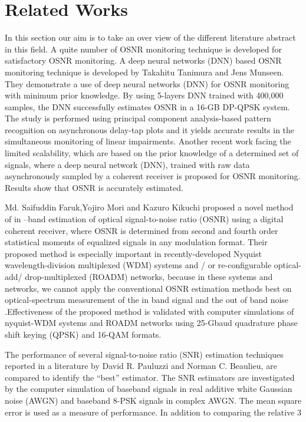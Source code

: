 \documentclass[12pt]{report}
\begin{document}
	\section{Related Works }
	In this section our aim is to take an over view of the different literature abstract in this field. 
	A quite number of OSNR monitoring technique is developed for satisfactory OSNR monitoring. A deep neural networks (DNN) based OSNR monitoring technique is developed by Takahitu Tanimura and Jens Munseen. 
	They demonstrate a use of deep neural networks (DNN) for OSNR monitoring with minimum prior knowledge. By using 5-layers DNN trained with 400,000 samples, the DNN successfully estimates OSNR in a 16-GB DP-QPSK system. 
	The study is performed using principal component analysis-based pattern recognition on asynchronous delay-tap plots and it yields accurate results in the simultaneous monitoring of linear impairments. Another recent work facing the limited scalability, which are based on the prior knowledge of a determined set of signals, where a deep neural network (DNN), trained with raw data asynchronously sampled by a coherent receiver is proposed for OSNR monitoring. Results show that OSNR is accurately estimated.
	
	Md. Saifuddin Faruk,Yojiro Mori and Kazuro Kikuchi proposed a novel method of in –band estimation of optical signal-to-noise ratio (OSNR) using a digital coherent receiver, where  OSNR is determined from second and fourth order statistical moments of equalized signals in any modulation format. Their proposed method is especially important in recently-developed Nyquist wavelength-division multiplexed (WDM) systems and / or re-configurable optical-add/ drop-multiplexed (ROADM) networks, because in these systems and networks, we cannot apply the conventional OSNR estimation methods best on optical-spectrum measurement of the in band signal and the out of band noise .Effectiveness of the proposed method is validated with computer simulations of nyquist-WDM systems and ROADM networks using 25-Gbaud quadrature phase shift keying (QPSK) and 16-QAM formats.
	
	
	The performance of several signal-to-noise ratio (SNR) estimation techniques reported in a literature by David R. Pauluzzi and Norman C. Beaulieu, are compared to identify the “best” estimator. The SNR estimators are investigated by the computer simulation of baseband signals in real additive white Gaussian noise (AWGN) and baseband 8-PSK signals in complex AWGN. The mean square error is used as a measure of performance. In addition to comparing the relative 
	3 
	
\end{document}
